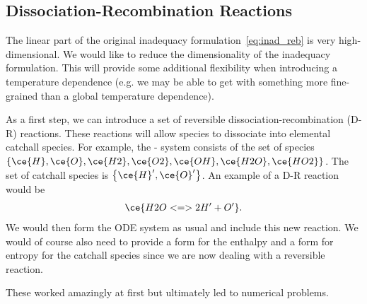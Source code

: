 \subsection{Dissociation-Recombination Reactions}
The linear part of the original inadequacy formulation~\ref{eq:inad_reb} is very 
high-dimensional.  We would like to reduce the dimensionality of the inadequacy 
formulation.  This will provide some additional flexibility when introducing a 
temperature dependence (e.g. we may be able to get with something more fine-grained 
than a global temperature dependence).

As a first step, we can introduce a set of reversible dissociation-recombination 
(D-R) reactions.  These reactions will allow species to dissociate into elemental 
catchall species.  For example, the - system consists of the set 
of species $\left\{\ce{H}, \ce{O}, \ce{H2}, \ce{O2}, \ce{OH}, \ce{H2O}, \ce{HO2}\right\}$. 
The set of catchall species is $\left\{\ce{H}^{\prime}, \ce{O}^{\prime}\right\}$. 
An example of a D-R reaction would be 
\begin{align}
  \ce{H2O <=> 2H^{\prime} + O^{\prime}}.
\end{align} 
We would then form the ODE system as usual and include this new reaction.  We 
would of course also need to provide a form for the enthalpy and a form for 
entropy for the catchall species since we are now dealing with a reversible 
reaction.  

These worked amazingly at first but ultimately led to numerical problems.

